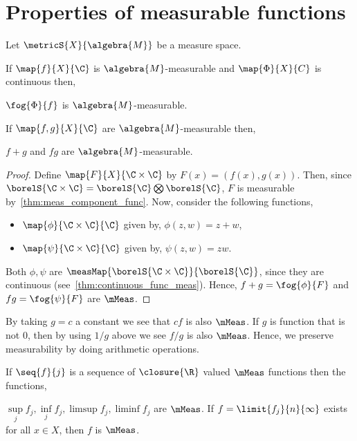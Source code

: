 \section{Properties of measurable functions}
Let $\metricS{X}{\algebra{M}}$ be a measure space.

\begin{Proposition}\label{prop:prop0_mfunc_composition_cont}
    If $\map{f}{X}{\C}$ is $\algebra{M}$-measurable and $\map{\Phi}{X}{C}$ is continuous then,
    \begin{properties}[series=mfunc]
    \item 
	$\fog{\Phi}{f}$ is $\algebra{M}$-measurable.
    \end{properties}
\end{Proposition}
\begin{Proposition}\label{prop:prop1_mfunc_additivity}
    If $\map{f,g}{X}{\C}$ are $\algebra{M}$-measurable then,
    \begin{properties}[resume*=mfunc]
    \item 
	$f+g$ and $fg$ are $\algebra{M}$-measurable.
    \end{properties}
\end{Proposition}
\begin{proof}
    Define $\map{F}{X}{\C \times \C}$ by $F(x) = (f(x),g(x))$. Then, since $\borelS{\C\times\C} =
    \borelS{\C}\bigotimes\borelS{\C}$, $F$ is measurable by~\ref{thm:meas_component_func}. Now, consider the
    following functions,
    \begin{itemize}
	\item $\map{\phi}{\C\times\C}{\C}$ given by, $\phi(z,w) = z + w$,
	\item $\map{\psi}{\C\times\C}{\C}$ given by, $\psi(z,w) = zw$.
    \end{itemize}
    Both $\phi,\psi$ are $\measMap{\borelS{\C\times\C}}{\borelS{\C}}$, since they are continuous
    (see~\ref{thm:continuous_func_meas}). Hence, $f + g = \fog{\phi}{F}$ and 
    $fg = \fog{\psi}{F}$ are $\mMeas$.
\end{proof}
By taking $g = c$ a constant we see that $cf$ is also $\mMeas$. If $g$ is function that is not $0$, then by
using $1/g$ above we see $f/g$ is also $\mMeas$. Hence, we preserve measurability by doing arithmetic
operations.
\begin{Proposition}\label{prop:prop2_mfunc_limits}
    If $\seq{f}{j}$ is a sequence of $\closure{\R}$ valued $\mMeas$ functions then the functions,
    \begin{properties}[resume*=mfunc]
    \item
	$\sup\limits_{j}f_j,\inf\limits_{j}f_j,\limsup f_j, \liminf f_j$ are $\mMeas$. If
	$f = \limit{f_j}{n}{\infty}$ exists for all $x\in X$, then $f$ is $\mMeas$.
    \end{properties}
\end{Proposition}
